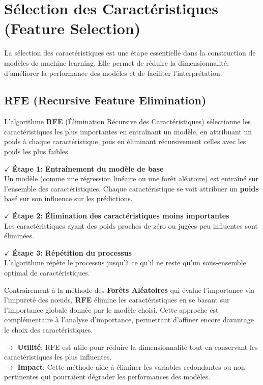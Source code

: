 \section{Sélection des Caractéristiques (Feature Selection)}

La sélection des caractéristiques est une étape essentielle dans la construction de modèles de machine learning. Elle permet de réduire la dimensionnalité, d'améliorer la performance des modèles et de faciliter l'interprétation. 

\subsection{RFE (Recursive Feature Elimination)}

L'algorithme \textbf{RFE} (Élimination Récursive des Caractéristiques) sélectionne les caractéristiques les plus importantes en entraînant un modèle, en attribuant un poids à chaque caractéristique, puis en éliminant récursivement celles avec les poids les plus faibles.

\textbf{\(\checkmark\)} \textbf{Étape 1: Entraînement du modèle de base} \\ 
    Un modèle (comme une régression linéaire ou une forêt aléatoire) est entraîné sur l'ensemble des caractéristiques. Chaque caractéristique se voit attribuer un \textbf{poids} basé sur son influence sur les prédictions.

\textbf{\(\checkmark\)} \textbf{Étape 2: Élimination des caractéristiques moins importantes} \\ 
    Les caractéristiques ayant des poids proches de zéro ou jugées peu influentes sont éliminées.

\textbf{\(\checkmark\)} \textbf{Étape 3: Répétition du processus} \\ 
    L'algorithme répète le processus jusqu'à ce qu'il ne reste qu'un sous-ensemble optimal de caractéristiques.

Contrairement à la méthode des \textbf{Forêts Aléatoires} qui évalue l'importance via l'impureté des nœuds, \textbf{RFE} élimine les caractéristiques en se basant sur l'importance globale donnée par le modèle choisi. Cette approche est complémentaire à l'analyse d'importance, permettant d'affiner encore davantage le choix des caractéristiques.


\noindent \textbf{\(\rightarrow\)} \textbf{Utilité}: RFE est utile pour réduire la dimensionnalité tout en conservant les caractéristiques les plus influentes.\\
\textbf{\(\rightarrow\)} \textbf{Impact}: Cette méthode aide à éliminer les variables redondantes ou non pertinentes qui pourraient dégrader les performances des modèles.


